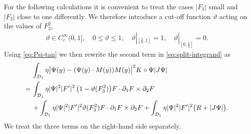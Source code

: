 \documentclass[reqno,makeidx,12pt]{amsart}
\theoremstyle{note}
\theoremstyle{definition}
\begin{document}
For the following calculations it is convenient to treat the cases $|F_3|$ small and $|F_3|$ close to one differently. We therefore introduce a cut-off function ${\vartheta}$ acting on the values of $F_3^2$, 
\begin{align}
	{\vartheta} \in C^\infty_c(0,1],\quad 0\leq {\vartheta}\leq 1,\quad {\vartheta}|_{[\frac{3}{4},1]}=1,\quad {\vartheta}|_{[0,\frac{1}{2}]}=0. \label{eq:ctf-theta}
\end{align}
Using \eqref{eq:Psi-tan} we then rewrite the second term in \eqref{eq:split-integrand} as
\begin{align}
	&\int_{{\mathcal{D}}_1} \eta \big|\Psi(y)-(\Psi(y)\cdot M(y)) M(y)\big|^2 K\circ \Psi |J\Psi| \notag\\
	=\, &\int_{{\mathcal{D}}_1} \eta |\Psi|^2 |F'|^2 \,\big(1-{\vartheta}(F_3^2)\big) F\cdot\partial_1 F \times \partial_2 F \notag\\
	&+ \int_{{\mathcal{D}}_1}\eta |\Psi|^2 |F'|^2  {\vartheta}(F_3^2) F\cdot\partial_1 F \times \partial_2 F+ \int_{{\mathcal{D}}_1} \eta |\Psi|^2 |F'|^2 \big( R + |J\Psi|\big) . \label{eq:split-2}
\end{align}
We treat the three terms on the right-hand side separately.
\end{document}
